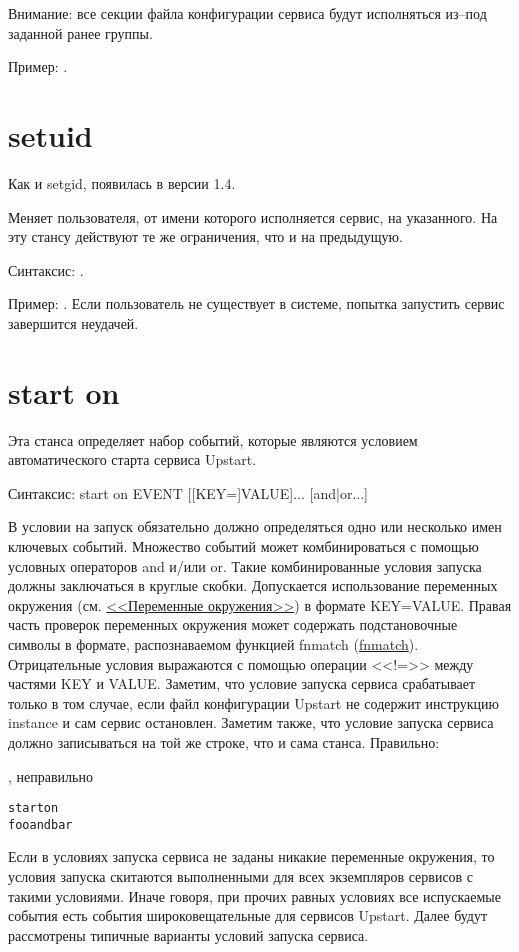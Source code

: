 Внимание: все секции файла конфигурации сервиса будут исполняться из--под заданной ранее группы. 

Пример: .
\section{setuid} \label{sec:Setuid}
Как и setgid, появилась в версии 1.4. 

Меняет пользователя, от имени которого исполняется сервис, на указанного. На эту стансу действуют те же ограничения, что и на предыдущую.

Синтаксис: . 

Пример: . Если пользователь не существует в системе, попытка запустить сервис завершится неудачей.
\section{start on} \label{sec:StartOn}
Эта станса определяет набор событий, которые являются условием автоматического старта сервиса Upstart.

Синтаксис: start on EVENT [[KEY=]VALUE]... [and|or...]

В условии на запуск обязательно должно определяться одно или несколько имен ключевых событий. Множество событий может комбинироваться с помощью условных операторов and и/или or. Такие комбинированные условия запуска должны заключаться в круглые скобки. Допускается использование переменных окружения (см. \hyperref[sec:EnviromentVariables]{<<Переменные окружения>>}) в формате KEY=VALUE. Правая часть проверок переменных окружения может содержать подстановочные символы в формате, распознаваемом функцией fnmatch (\href{http://manpages.ubuntu.com/manpages/utopic/en/man3/fnmatch.3.html}{fnmatch}). 
Отрицательные условия выражаются с помощью операции <<!=>> между частями KEY и VALUE.
Заметим, что условие запуска сервиса срабатывает только в том случае, если файл конфигурации Upstart не содержит инструкцию instance и сам сервис остановлен.
Заметим также, что условие запуска сервиса должно записываться на той же строке, что и сама станса.
Правильно: \begin{alltt}
\end{alltt}, неправильно \begin{alltt}
start on 
		foo and bar
\end{alltt} 
Если в условиях запуска сервиса не заданы никакие переменные окружения, то условия запуска скитаются выполненными для всех экземпляров сервисов с такими условиями. Иначе говоря, при прочих равных условиях все испускаемые события есть события широковещательные для сервисов Upstart.
Далее будут рассмотрены типичные варианты условий запуска сервиса.

